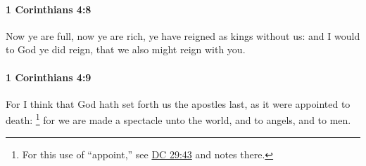		\paragraph{1 Corinthians 4:8} %
			\label{1CORINTHIANS-4-8}

			Now ye are full, now ye are rich, ye have reigned as kings without us: and I would to God ye did reign, that we also might reign with you.

			\begin{framed}
			\scriptsize
				\begin{compactdesc}
					\item[SBLG] 
				\end{compactdesc}
			\end{framed}

		\paragraph{1 Corinthians 4:9} %
			\label{1CORINTHIANS-4-9}

			For I think that God hath set forth us the apostles last, as it were appointed to death:%
				\footnote{%
					For this use of ``appoint,'' see \hyperref[DC29-43]{DC 29:43} and notes there.
					}
			for we are made a spectacle unto the world, and to angels, and to men.

